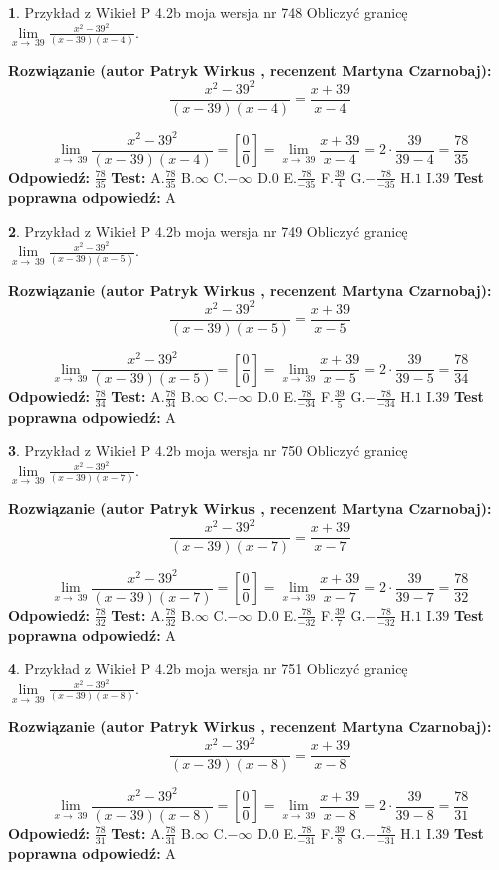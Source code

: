 \documentclass[12pt, a4paper]{article}
\theoremstyle{definition} %
\newtheorem{zad}{}
\newcommand{\zadStart}[1]{\begin{zad}#1\newline}
\newcommand{\zadStop}{\end{zad}}
\newcommand{\rozwStart}[2]{\noindent \textbf{Rozwiązanie (autor #1 , recenzent #2): }\newline}
\newcommand{\rozwStop}{\newline}
\newcommand{\odpStart}{\noindent \textbf{Odpowiedź:}\newline}
\newcommand{\odpStop}{\newline}
\newcommand{\testStart}{\noindent \textbf{Test:}\newline}
\newcommand{\testStop}{\newline}
\newcommand{\kluczStart}{\noindent \textbf{Test poprawna odpowiedź:}\newline}
\newcommand{\kluczStop}{\newline}
\begin{document}
\zadStart{Przykład z Wikieł P 4.2b moja wersja nr 748}
Obliczyć granicę $\lim\limits_{x\to\ 39}\frac{x^{2}-39^{2}}{(x-39)(x-4)}$.
\zadStop
\rozwStart{Patryk Wirkus}{Martyna Czarnobaj}
$$\frac{x^{2}-39^{2}}{(x-39)(x-4)}=\frac{x+39}{x-4}$$

$$\lim\limits_{x\to\ 39}\frac{x^{2}-39^{2}}{(x-39)(x-4)}=[\frac{0}{0}]=\lim\limits_{x\to\ 39}\frac{x+39}{x-4}=2 \cdot \frac{39}{39-4} = \frac{78}{35}$$
\rozwStop
\odpStart
$\frac{78}{35}$
\odpStop
\testStart
A.$\frac{78}{35}$
B.$\infty$
C.$-\infty$
D.$0$
E.$\frac{78}{-35}$
F.$\frac{39}{4}$
G.$-\frac{78}{-35}$
H.$1$
I.$39$
\testStop
\kluczStart
A
\kluczStop



\zadStart{Przykład z Wikieł P 4.2b moja wersja nr 749}
Obliczyć granicę $\lim\limits_{x\to\ 39}\frac{x^{2}-39^{2}}{(x-39)(x-5)}$.
\zadStop
\rozwStart{Patryk Wirkus}{Martyna Czarnobaj}
$$\frac{x^{2}-39^{2}}{(x-39)(x-5)}=\frac{x+39}{x-5}$$

$$\lim\limits_{x\to\ 39}\frac{x^{2}-39^{2}}{(x-39)(x-5)}=[\frac{0}{0}]=\lim\limits_{x\to\ 39}\frac{x+39}{x-5}=2 \cdot \frac{39}{39-5} = \frac{78}{34}$$
\rozwStop
\odpStart
$\frac{78}{34}$
\odpStop
\testStart
A.$\frac{78}{34}$
B.$\infty$
C.$-\infty$
D.$0$
E.$\frac{78}{-34}$
F.$\frac{39}{5}$
G.$-\frac{78}{-34}$
H.$1$
I.$39$
\testStop
\kluczStart
A
\kluczStop



\zadStart{Przykład z Wikieł P 4.2b moja wersja nr 750}
Obliczyć granicę $\lim\limits_{x\to\ 39}\frac{x^{2}-39^{2}}{(x-39)(x-7)}$.
\zadStop
\rozwStart{Patryk Wirkus}{Martyna Czarnobaj}
$$\frac{x^{2}-39^{2}}{(x-39)(x-7)}=\frac{x+39}{x-7}$$

$$\lim\limits_{x\to\ 39}\frac{x^{2}-39^{2}}{(x-39)(x-7)}=[\frac{0}{0}]=\lim\limits_{x\to\ 39}\frac{x+39}{x-7}=2 \cdot \frac{39}{39-7} = \frac{78}{32}$$
\rozwStop
\odpStart
$\frac{78}{32}$
\odpStop
\testStart
A.$\frac{78}{32}$
B.$\infty$
C.$-\infty$
D.$0$
E.$\frac{78}{-32}$
F.$\frac{39}{7}$
G.$-\frac{78}{-32}$
H.$1$
I.$39$
\testStop
\kluczStart
A
\kluczStop



\zadStart{Przykład z Wikieł P 4.2b moja wersja nr 751}
Obliczyć granicę $\lim\limits_{x\to\ 39}\frac{x^{2}-39^{2}}{(x-39)(x-8)}$.
\zadStop
\rozwStart{Patryk Wirkus}{Martyna Czarnobaj}
$$\frac{x^{2}-39^{2}}{(x-39)(x-8)}=\frac{x+39}{x-8}$$

$$\lim\limits_{x\to\ 39}\frac{x^{2}-39^{2}}{(x-39)(x-8)}=[\frac{0}{0}]=\lim\limits_{x\to\ 39}\frac{x+39}{x-8}=2 \cdot \frac{39}{39-8} = \frac{78}{31}$$
\rozwStop
\odpStart
$\frac{78}{31}$
\odpStop
\testStart
A.$\frac{78}{31}$
B.$\infty$
C.$-\infty$
D.$0$
E.$\frac{78}{-31}$
F.$\frac{39}{8}$
G.$-\frac{78}{-31}$
H.$1$
I.$39$
\testStop
\kluczStart
A
\kluczStop
\end{document}
